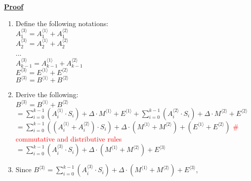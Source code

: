 $ $

\noindent \textbf{\underline{Proof}}
\begin{enumerate}
\item Define the following notations: \\
$A_1^{\langle 3 \rangle} = A_1^{\langle 1 \rangle} + A_1^{\langle 2 \rangle}$ \\
$A_2^{\langle 3 \rangle} = A_2^{\langle 1 \rangle} + A_2^{\langle 2 \rangle}$ \\
... \\
$A_{k-1}^{\langle 3 \rangle} = A_{k-1}^{\langle 1 \rangle} + A_{k-1}^{\langle 2 \rangle}$ \\
$E^{\langle 3 \rangle} = E^{\langle 1 \rangle} + E^{\langle 2 \rangle}$ \\
$B^{\langle 3 \rangle} = B^{\langle 1 \rangle} + B^{\langle 2 \rangle}$
\item Derive the following: \\
$B^{\langle 3 \rangle} = B^{\langle 1 \rangle} + B^{\langle 2 \rangle}$ \\
$ = \sum\limits_{i=0}^{k-1}{(A_i^{\langle 1 \rangle} \cdot S_i)} + \Delta \cdot M^{\langle 1 \rangle} + E^{\langle 1 \rangle} + \sum\limits_{i=0}^{k-1}{(A_i^{\langle 2 \rangle} \cdot S_i)} + \Delta \cdot M^{\langle 2 \rangle} + E^{\langle 2 \rangle}$ \\ 
$= \sum\limits_{i=0}^{k-1}{((A_i^{\langle 1 \rangle} + A_i^{\langle 2 \rangle}) \cdot S_i)} + \Delta \cdot (M^{\langle 1 \rangle} + M^{\langle 2 \rangle}) + (E^{\langle 1 \rangle} + E^{\langle 2 \rangle})$ \textcolor{red}{\# commutative and distributive rules} \\
$= \sum\limits_{i=0}^{k-1}{(A_i^{\langle 3 \rangle} \cdot S_i)} + \Delta \cdot (M^{\langle 1 \rangle} + M^{\langle 2 \rangle}) + E^{\langle 3 \rangle}$ \\
\item Since $B^{\langle 3 \rangle} = \sum\limits_{i=0}^{k-1}{(A_i^{\langle 3 \rangle} \cdot S_i)} + \Delta \cdot (M^{\langle 1 \rangle} + M^{\langle 2 \rangle}) + E^{\langle 3 \rangle}$, 


\end{enumerate}

